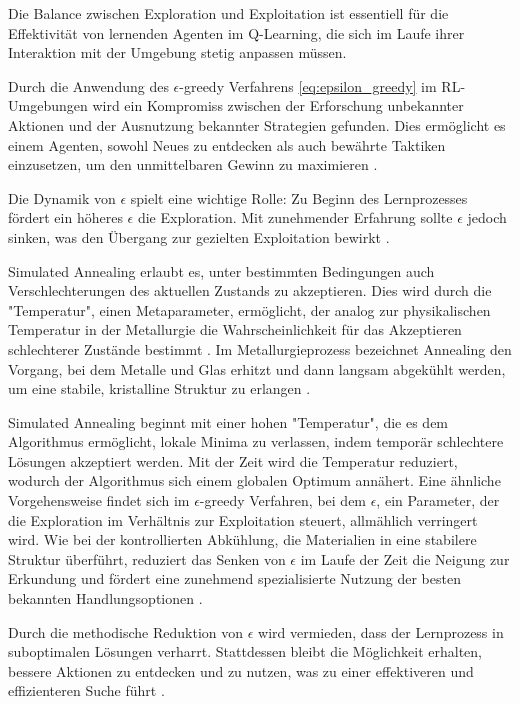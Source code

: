 Die Balance zwischen Exploration und Exploitation ist essentiell für die Effektivität von lernenden Agenten im Q-Learning, die sich im Laufe ihrer Interaktion mit der Umgebung stetig anpassen müssen.

Durch die Anwendung des \(\epsilon\)-greedy Verfahrens \ref{eq:epsilon_greedy} im RL-Umgebungen wird ein Kompromiss zwischen der Erforschung unbekannter Aktionen und der Ausnutzung bekannter Strategien gefunden. Dies ermöglicht es einem Agenten, sowohl Neues zu entdecken als auch bewährte Taktiken einzusetzen, um den unmittelbaren Gewinn zu maximieren \cite{SuttonBarto2018}.

Die Dynamik von \(\epsilon\) spielt eine wichtige Rolle: Zu Beginn des Lernprozesses fördert ein höheres \(\epsilon\) die Exploration. Mit zunehmender Erfahrung sollte \(\epsilon\) jedoch sinken, was den Übergang zur gezielten Exploitation bewirkt \cite{morales2020grokking}.

Simulated Annealing erlaubt es, unter bestimmten Bedingungen auch Verschlechterungen des aktuellen Zustands zu akzeptieren. Dies wird durch die "Temperatur", einen Metaparameter, ermöglicht, der analog zur physikalischen Temperatur in der Metallurgie die Wahrscheinlichkeit für das Akzeptieren schlechterer Zustände bestimmt \cite{russell2021ai}. Im Metallurgieprozess bezeichnet Annealing den Vorgang, bei dem Metalle und Glas erhitzt und dann langsam abgekühlt werden, um eine stabile, kristalline Struktur zu erlangen \cite{russell2021ai}.
\label{sec:Simulated Annealing}

Simulated Annealing beginnt mit einer hohen "Temperatur", die es dem Algorithmus ermöglicht, lokale Minima zu verlassen, indem temporär schlechtere Lösungen akzeptiert werden. Mit der Zeit wird die Temperatur reduziert, wodurch der Algorithmus sich einem globalen Optimum annähert. Eine ähnliche Vorgehensweise findet sich im \(\epsilon\)-greedy Verfahren, bei dem \(\epsilon\), ein Parameter, der die Exploration im Verhältnis zur Exploitation steuert, allmählich verringert wird. Wie bei der kontrollierten Abkühlung, die Materialien in eine stabilere Struktur überführt, reduziert das Senken von \(\epsilon\) im Laufe der Zeit die Neigung zur Erkundung und fördert eine zunehmend spezialisierte Nutzung der besten bekannten Handlungsoptionen \cite{russell2021ai}.

Durch die methodische Reduktion von \(\epsilon\) wird vermieden, dass der Lernprozess in suboptimalen Lösungen verharrt. Stattdessen bleibt die Möglichkeit erhalten, bessere Aktionen zu entdecken und zu nutzen, was zu einer effektiveren und effizienteren Suche führt \cite{russell2021ai}.

